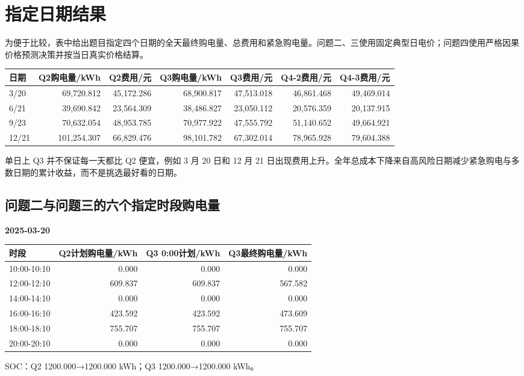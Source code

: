 \section{指定日期结果}

为便于比较，表中给出题目指定四个日期的全天最终购电量、总费用和紧急购电量。问题二、三使用固定典型日电价；问题四使用严格因果价格预测决策并按当日真实价格结算。

\begin{longtable}[]{@{}lrrrrrr@{}}
\toprule
日期 & Q2购电量/kWh & Q2费用/元 & Q3购电量/kWh & Q3费用/元 & Q4-2费用/元 & Q4-3费用/元 \\
\midrule
\endhead
3/20 & 69,720.812 & 45,172.286 & 68,900.817 & 47,513.018 & 46,861.468 & 49,469.014 \\
6/21 & 39,690.842 & 23,564.309 & 38,486.827 & 23,050.112 & 20,576.359 & 20,137.915 \\
9/23 & 70,632.054 & 48,953.785 & 70,977.922 & 47,555.792 & 51,140.652 & 49,664.921 \\
12/21 & 101,254.307 & 66,829.476 & 98,101.782 & 67,302.014 & 78,965.928 & 79,604.388 \\
\bottomrule
\end{longtable}

单日上 Q3 并不保证每一天都比 Q2 便宜，例如 3 月 20 日和 12 月 21 日出现费用上升。全年总成本下降来自高风险日期减少紧急购电与多数日期的累计收益，而不是挑选最好看的日期。

\subsection{问题二与问题三的六个指定时段购电量}

\textbf{2025-03-20}
\begin{longtable}[]{@{}lrrr@{}}
\toprule
时段 & Q2计划购电量/kWh & Q3 0:00计划/kWh & Q3最终购电量/kWh \\
\midrule\endhead
10:00-10:10 & 0.000 & 0.000 & 0.000 \\
12:00-12:10 & 609.837 & 609.837 & 567.582 \\
14:00-14:10 & 0.000 & 0.000 & 0.000 \\
16:00-16:10 & 423.592 & 423.592 & 473.609 \\
18:00-18:10 & 755.707 & 755.707 & 755.707 \\
20:00-20:10 & 0.000 & 0.000 & 0.000 \\
\bottomrule\end{longtable}
SOC：Q2 1200.000→1200.000 kWh；Q3 1200.000→1200.000 kWh。

